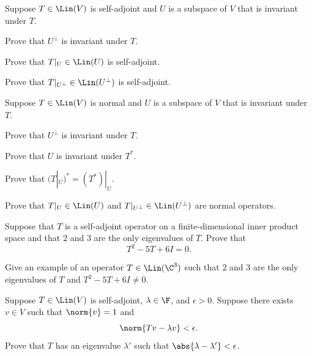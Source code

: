 \begin{exercise}
Suppose $T\in\Lin(V)$ is self-adjoint and $U$ is a subspace of $V$ that is
invariant under $T$.
\begin{parts}
\item Prove that $U^\perp$ is invariant under $T$.
\item Prove that $T|_U\in\Lin(U)$ is self-adjoint.
\item Prove that $T|_{U^\perp}\in\Lin(U^\perp)$ is self-adjoint.
\end{parts}
\end{exercise}

\begin{exercise}
Suppose $T\in\Lin(V)$ is normal and $U$ is a subspace of $V$ that is invariant
under $T$.
\begin{parts}
\item Prove that $U^\perp$ is invariant under $T$.
\item Prove that $U$ is invariant under $T^*$.
\item Prove that $(T|_U)^*=(T^*)|_U$.
\item Prove that $T|_U\in\Lin(U)$ and $T|_{U^\perp}\in\Lin(U^\perp)$ are normal
  operators.
\end{parts}
\end{exercise}

\begin{exercise}
Suppose that $T$ is a self-adjoint operator on a finite-dimensional inner
product space and that $2$ and $3$ are the only eigenvalues of $T$. Prove that
\[ T^2-5T+6I = 0. \]
\end{exercise}

\begin{exercise}
Give an example of an operator $T\in\Lin(\C^3)$ such that $2$ and $3$ are the
only eigenvalues of $T$ and $T^2-5T+6I\ne0$.
\end{exercise}

\begin{exercise}
Suppose $T\in\Lin(V)$ is self-adjoint, $\lambda\in\F$, and $\epsilon>0$.
Suppose there exists $v\in V$ such that $\norm{v}=1$ and
\[ \norm{Tv-\lambda v} < \epsilon. \]
Prove that $T$ has an eigenvalue $\lambda'$ such that
$\abs{\lambda-\lambda'}<\epsilon$.
\end{exercise}

